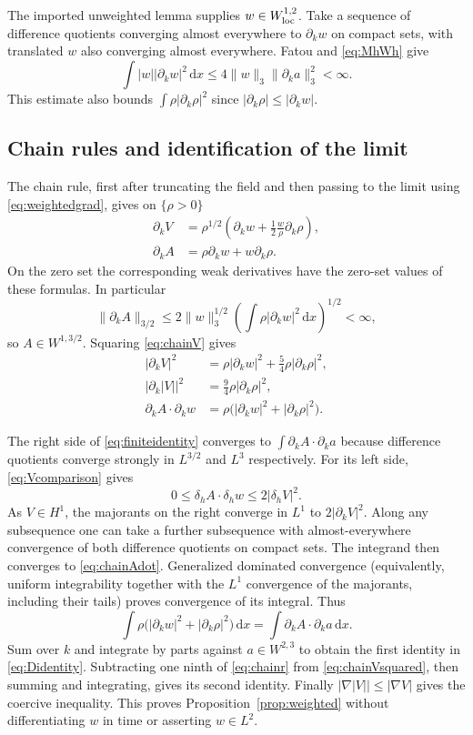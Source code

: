 \documentclass[11pt,a4paper]{article}
\theoremstyle{definition}\newtheorem{definition}[theorem]{Definition}
\theoremstyle{remark}\newtheorem{remark}[theorem]{Remark}
\newcommand{\dd}{\,\mathrm d}
\newcommand{\norm}[1]{\lVert #1\rVert}
\numberwithin{equation}{section}
\begin{document}
The imported unweighted lemma supplies $w\in W^{1,2}_{\rm loc}$. Take a sequence of difference quotients converging almost everywhere to $\partial_kw$ on compact sets, with translated $w$ also converging almost everywhere. Fatou and \eqref{eq:MhWh} give
\begin{equation}\label{eq:weightedgrad}
 \int|w||\partial_kw|^2\dd x
 \le4\norm w_3\norm{\partial_ka}_3^2<\infty.
\end{equation}
This estimate also bounds $\int\rho|\partial_k\rho|^2$ since $|\partial_k\rho|\le|\partial_kw|$.

\subsection{Chain rules and identification of the limit}
The chain rule, first after truncating the field and then passing to the limit using \eqref{eq:weightedgrad}, gives on $\{\rho>0\}$
\begin{align}
 \partial_kV&=\rho^{1/2}\left(\partial_kw+\tfrac12\frac w\rho\partial_k\rho\right),\label{eq:chainV}\\
 \partial_kA&=\rho\partial_kw+w\partial_k\rho.\label{eq:chainA}
\end{align}
On the zero set the corresponding weak derivatives have the zero-set values of these formulas. In particular
\[
 \norm{\partial_kA}_{3/2}
 \le2\norm w_3^{1/2}\left(\int\rho|\partial_kw|^2\dd x\right)^{1/2}<\infty,
\]
so $A\in W^{1,3/2}$. Squaring \eqref{eq:chainV} gives
\begin{align}
 |\partial_kV|^2&=\rho|\partial_kw|^2+\tfrac54\rho|\partial_k\rho|^2,\label{eq:chainVsquared}\\
 |\partial_k|V||^2&=\tfrac94\rho|\partial_k\rho|^2,\label{eq:chainr}\\
 \partial_kA\cdot\partial_kw&=\rho\bigl(|\partial_kw|^2+|\partial_k\rho|^2\bigr).\label{eq:chainAdot}
\end{align}

The right side of \eqref{eq:finiteidentity} converges to $\int\partial_kA\cdot\partial_ka$ because difference quotients converge strongly in $L^{3/2}$ and $L^3$ respectively. For its left side, \eqref{eq:Vcomparison} gives
\[
 0\le\delta_hA\cdot\delta_hw\le2|\delta_hV|^2.
\]
As $V\in H^1$, the majorants on the right converge in $L^1$ to $2|\partial_kV|^2$. Along any subsequence one can take a further subsequence with almost-everywhere convergence of both difference quotients on compact sets. The integrand then converges to \eqref{eq:chainAdot}. Generalized dominated convergence (equivalently, uniform integrability together with the $L^1$ convergence of the majorants, including their tails) proves convergence of its integral. Thus
\[
 \int\rho\bigl(|\partial_kw|^2+|\partial_k\rho|^2\bigr)\dd x
 =\int\partial_kA\cdot\partial_ka\dd x.
\]
Sum over $k$ and integrate by parts against $a\in W^{2,3}$ to obtain the first identity in \eqref{eq:Didentity}. Subtracting one ninth of \eqref{eq:chainr} from \eqref{eq:chainVsquared}, then summing and integrating, gives its second identity. Finally $|\nabla|V||\le|\nabla V|$ gives the coercive inequality. This proves Proposition~\ref{prop:weighted} without differentiating $w$ in time or asserting $w\in L^2$.
\end{document}
